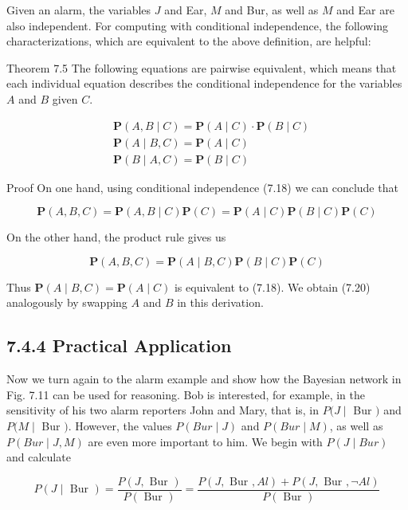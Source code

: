 \documentclass[10pt]{book}
\begin{document}
\begin{center}
\begin{enumerate}
Given an alarm, the variables $J$ and Ear, $M$ and Bur, as well as $M$ and Ear are also independent. For computing with conditional independence, the following characterizations, which are equivalent to the above definition, are helpful:

Theorem 7.5 The following equations are pairwise equivalent, which means that each individual equation describes the conditional independence for the variables $A$ and $B$ given $C$.


\begin{align*}
& \boldsymbol{P}(A, B \mid C)=\boldsymbol{P}(A \mid C) \cdot \boldsymbol{P}(B \mid C)  \tag{7.18}\\
& \boldsymbol{P}(A \mid B, C)=\boldsymbol{P}(A \mid C)  \tag{7.19}\\
& \boldsymbol{P}(B \mid A, C)=\boldsymbol{P}(B \mid C) \tag{7.20}
\end{align*}


Proof On one hand, using conditional independence (7.18) we can conclude that

$$
\boldsymbol{P}(A, B, C)=\boldsymbol{P}(A, B \mid C) \boldsymbol{P}(C)=\boldsymbol{P}(A \mid C) \boldsymbol{P}(B \mid C) \boldsymbol{P}(C)
$$

On the other hand, the product rule gives us

$$
\boldsymbol{P}(A, B, C)=\boldsymbol{P}(A \mid B, C) \boldsymbol{P}(B \mid C) \boldsymbol{P}(C)
$$

Thus $\boldsymbol{P}(A \mid B, C)=\boldsymbol{P}(A \mid C)$ is equivalent to (7.18). We obtain (7.20) analogously by swapping $A$ and $B$ in this derivation.

\subsection*{7.4.4 Practical Application}
Now we turn again to the alarm example and show how the Bayesian network in Fig. 7.11 can be used for reasoning. Bob is interested, for example, in the sensitivity of his two alarm reporters John and Mary, that is, in $P(J \mid$ Bur $)$ and $P(M \mid$ Bur $)$. However, the values $P(B u r \mid J)$ and $P(B u r \mid M)$, as well as $P(B u r \mid J, M)$ are even more important to him. We begin with $P(J \mid B u r)$ and calculate


\begin{equation*}
P(J \mid \text { Bur })=\frac{P(J, \text { Bur })}{P(\text { Bur })}=\frac{P(J, \text { Bur }, A l)+P(J, \text { Bur }, \neg A l)}{P(\text { Bur })} \tag{7.21}
\end{equation*}



\end{enumerate}
\end{center}
\end{document}
